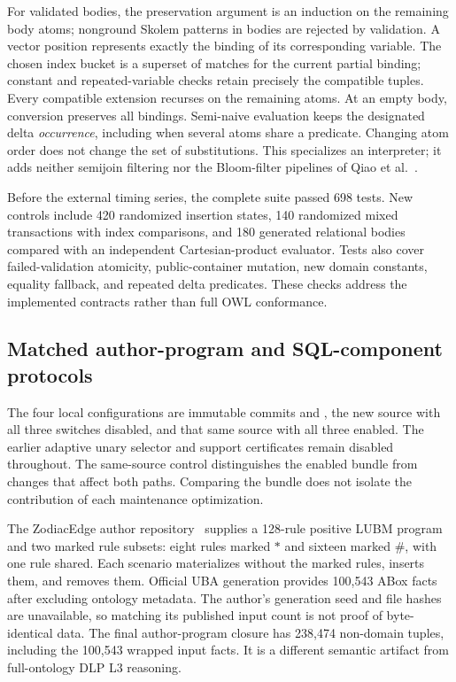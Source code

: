 For validated bodies, the preservation argument is an induction on the remaining
body atoms; nonground Skolem patterns in bodies are rejected by validation. A
vector position represents exactly the binding of its corresponding variable.
The chosen index bucket is a superset of matches for the current partial
binding; constant and repeated-variable checks retain precisely the compatible
tuples. Every compatible extension recurses on the remaining atoms. At an
empty body, conversion preserves all bindings. Semi-naive evaluation keeps the
designated delta \emph{occurrence}, including when several atoms share a
predicate. Changing atom order does not change the set of substitutions.
This specializes an interpreter; it adds neither semijoin filtering nor the
Bloom-filter pipelines of Qiao et al.~\cite{qiao2026}.

Before the external timing series, the complete suite passed 698 tests. New
controls include 420 randomized insertion states, 140 randomized mixed
transactions with index comparisons, and 180 generated relational bodies
compared with an independent Cartesian-product evaluator. Tests also cover
failed-validation atomicity, public-container mutation, new domain constants,
equality fallback, and repeated delta predicates. These checks address the
implemented contracts rather than full OWL conformance.

\subsection{Matched author-program and SQL-component protocols}
The four local configurations are immutable commits  and
, the new source with all three switches disabled, and that same
source with all three enabled. The earlier adaptive unary selector and support
certificates remain disabled throughout. The same-source control distinguishes
the enabled bundle from changes that affect both paths. Comparing the bundle
does not isolate the contribution of each maintenance optimization.

The ZodiacEdge author repository~\cite{zodiacartifact} supplies a 128-rule
positive LUBM program and two marked rule subsets: eight rules marked $*$ and
sixteen marked $\#$, with one rule shared. Each scenario materializes without
the marked rules, inserts them, and removes them. Official UBA generation
provides 100,543 ABox facts after excluding ontology metadata. The author's
generation seed and file hashes are unavailable, so matching its published
input count is not proof of byte-identical data. The final author-program
closure has 238,474 non-domain tuples, including the 100,543 wrapped input
facts. It is a different semantic artifact from full-ontology DLP L3 reasoning.

